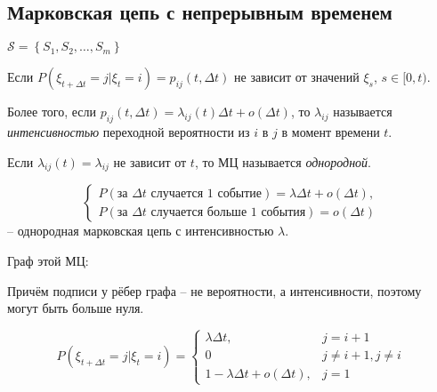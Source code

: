 \subsection{Марковская цепь с непрерывным временем}

$\mathcal{S} = \left\{ S_1, S_2, \dots, S_m \right\}$

\begin{definition}
  Если $P(\xi_{t+\Delta t} = j | \xi_t = i) = p_{ij}(t, \Delta t)$ не зависит от значений $\xi_s$, 
  $s \in [0, t)$.

  Более того, если $p_{ij}(t, \Delta t) = \lambda_{ij}(t) \Delta t + o(\Delta t)$, 
  то $\lambda_{ij} $ называется \emph{интенсивностью} переходной вероятности
  из $i$ в $j$ в момент времени $t$.

  Если $\lambda_{ij} (t) = \lambda_{ij}$ не зависит от $t$, то МЦ называется \emph{однородной}.
\end{definition}

\begin{ex}
  \[
    \begin{cases}
      P(\text{за $\Delta t$ случается 1 событие}) = \lambda \Delta t + o(\Delta t), \\
      P(\text{за $\Delta t$ случается больше 1 события}) = o(\Delta t)
    \end{cases}
  \]
  -- однородная марковская цепь с интенсивностью $\lambda$.


  Граф этой МЦ:

  Причём подписи у рёбер графа -- не вероятности, а интенсивности, поэтому могут
  быть больше нуля.

  \[
    P(\xi_{t+\Delta t} = j | \xi_t = i) = \begin{cases}
      \lambda \Delta t, & j = i+1 \\
      0 & j \neq i+1, j \neq i \\
      1-\lambda \Delta t + o(\Delta t), & j =1
    \end{cases}
  \]
\end{ex}

